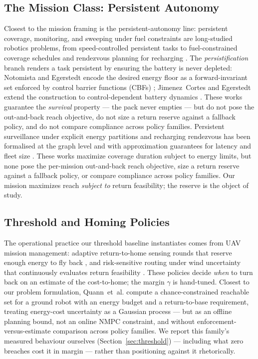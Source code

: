 \documentclass[preprint,12pt]{elsarticle}
\begin{document}
\subsection{The Mission Class: Persistent Autonomy}
Closest to the mission framing is the persistent-autonomy line:
persistent coverage, monitoring, and sweeping under fuel constraints
are long-studied robotics problems, from speed-controlled persistent
tasks \cite{smith2012persistent} to fuel-constrained coverage
schedules \cite{mitchell2015multirobot} and rendezvous planning for
recharging \cite{mathew2015multirobot}. The \emph{persistification}
branch renders a task persistent by ensuring the battery is never
depleted: Notomista and Egerstedt encode the desired energy floor as a
forward-invariant set enforced by control barrier functions (CBFs)
\cite{notomista2021persistification}; Jimenez~Cortes and Egerstedt
extend the construction to control-dependent battery dynamics
\cite{cortes2022task}. These works guarantee the \emph{survival}
property --- the pack never empties --- but do not pose the
out-and-back reach objective, do not size a return reserve against a
fallback policy, and do not compare compliance across policy families.
Persistent surveillance under explicit energy partitions and
recharging rendezvous has been formalised at the graph level
\cite{lin2022robust} and with approximation guarantees for
latency and fleet size \cite{asghar2025multirobot}. These works
maximize coverage duration subject to energy limits, but none
pose the per-mission out-and-back reach objective, size a
return reserve against a fallback policy, or compare compliance
across policy families. Our mission maximizes reach \emph{subject
to} return feasibility; the reserve is the object of study.

\subsection{Threshold and Homing Policies}
The operational practice our threshold baseline instantiates comes from
UAV mission management: adaptive return-to-home sensing rounds that
reserve enough energy to fly back \cite{huang2015adaptive}, and
risk-sensitive routing under wind uncertainty that continuously
evaluates return feasibility \cite{li2026robust}. These policies decide
\emph{when} to turn back on an estimate of the cost-to-home; the margin
$\gamma$ is hand-tuned. Closest to our problem formulation,
Quann~et~al. \cite{quann2019chance} compute a chance-constrained
reachable set for a ground robot with an energy budget and a
return-to-base requirement, treating energy-cost uncertainty as a
Gaussian process --- but as an offline planning bound, not an
online NMPC constraint, and without enforcement-versus-estimate
comparison across policy families. We report this family's measured behaviour
ourselves (Section~\ref{sec:threshold}) --- including what zero
breaches cost it in margin --- rather than positioning against it
 rhetorically.
\end{document}
